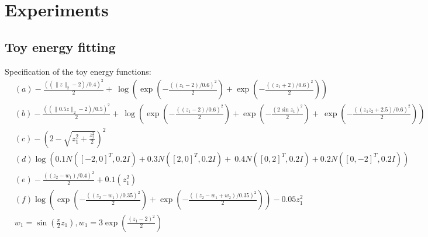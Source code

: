 \documentclass{article}
\begin{document}

\section{Experiments}

\subsection{Toy energy fitting}
\label{sec:ToyFit}


Specification of the toy energy functions:
\begin{align*} \label{toy_models}
&(a) -\frac{((\|z\|_2 - 2) / 0.4)^2}{2} + \
\log(\exp (-\frac{((z_1 - 2) / 0.6)^2}{2}) + \exp (-\frac{((z_1 + 2) / 0.6)^2}{2})) \\
&(b) -\frac{((\|0.5 z\|_2 - 2) / 0.5)^2}{2} + \
\log(\exp (-\frac{((z_1 - 2) / 0.6)^2}{2}) + \exp (-\frac{(2 \sin{z_1})^2}{2}) + \
\exp (-\frac{((z_1 z_2 + 2.5) / 0.6)^2}{2})) \\
&(c) -(2 - \sqrt{z_1^2 + \frac{z_2^2}{2}})^2\\
&(d) \log(0.1 N([-2, 0]^T, 0.2 I) + 0.3 N([2, 0]^T, 0.2 I) + \
0.4 N([0, 2]^T, 0.2 I) + 0.2 N([0, -2]^T, 0.2 I) ) \\
&(e) -\frac{((z_2 - w_1) / 0.4)^2}{2} + 0.1 (z_1^2) \\
&(f) \log(\exp (-\frac{((z_2 - w_1) / 0.35)^2}{2}) + \exp (-\frac{((z_2 - w_1 + w_2) / 0.35)^2}{2})) - 0.05 z_1^2 \\
& w_1 = \sin(\frac{\pi}{2}z_1), w_1 = 3\exp(\frac{(z_1 - 2)^2}{2})
\end{align*}
\end{document}
